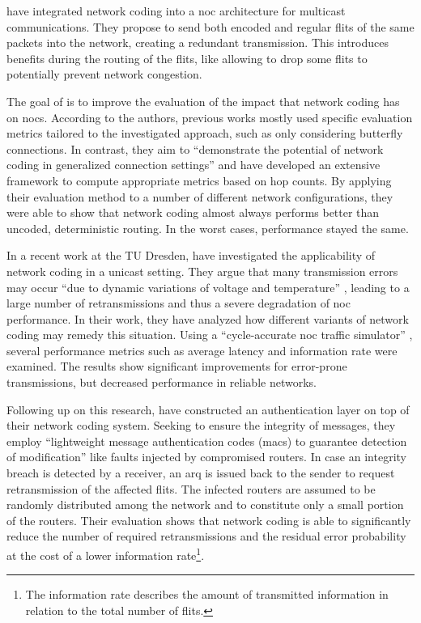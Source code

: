 \citeauthor{xue15ncnoc} \cite{xue15ncnoc} have integrated network coding into a \gls{noc} architecture for multicast communications. They propose to
send both encoded and regular flits of the same packets into the network, creating a redundant transmission. This introduces benefits during the
routing of the flits, like allowing to drop some flits to potentially prevent network congestion.

The goal of \citeauthor{vonbun13nchopcount} \cite{vonbun13nchopcount} is to improve the evaluation of the impact that network coding has on
\glspl{noc}. According to the authors, previous works mostly used specific evaluation metrics tailored to the investigated approach, such as only
considering butterfly connections. In contrast, they aim to \enquote{demonstrate the potential of network coding in generalized connection settings}
\cite[2]{vonbun13nchopcount} and have developed an extensive framework to compute appropriate metrics based on hop counts. By applying their
evaluation method to a number of different network configurations, they were able to show that network coding almost always performs better than uncoded,
deterministic routing. In the worst cases, performance stayed the same.

In a recent work at the TU Dresden, \citeauthor{moriam15manycorenc} \cite{moriam15manycorenc} have investigated the applicability of network coding in
a unicast setting. They argue that many transmission errors may occur \enquote{due to dynamic variations of voltage and temperature}
\cite[1]{moriam15manycorenc}, leading to a large number of retransmissions and thus a severe degradation of \gls{noc} performance. In their work, they
have analyzed how different variants of network coding may remedy this situation. Using a \enquote{cycle-accurate \gls{noc} traffic simulator}
\cite[3]{moriam15manycorenc}, several performance metrics such as average latency and information rate were examined. The results show significant
improvements for error-prone transmissions, but decreased performance in reliable networks.

Following up on this research, \citeauthor{moriam18activeattackers} \cite{moriam18activeattackers} have constructed an authentication layer on top of
their network coding system. Seeking to ensure the integrity of messages, they employ \enquote{lightweight message authentication codes (\glspl{mac})
to guarantee detection of modification} \cite[1]{moriam18activeattackers} like faults injected by compromised routers. In case an integrity breach is
detected by a receiver, an \gls{arq} is issued back to the sender to request retransmission of the affected flits. The infected routers are assumed to
be randomly distributed among the network and to constitute only a small portion of the routers. Their evaluation shows that network coding is able to
significantly reduce the number of required retransmissions and the residual error probability at the cost of a lower information rate\footnote{The
information rate describes the amount of transmitted information in relation to the total number of flits.}.

